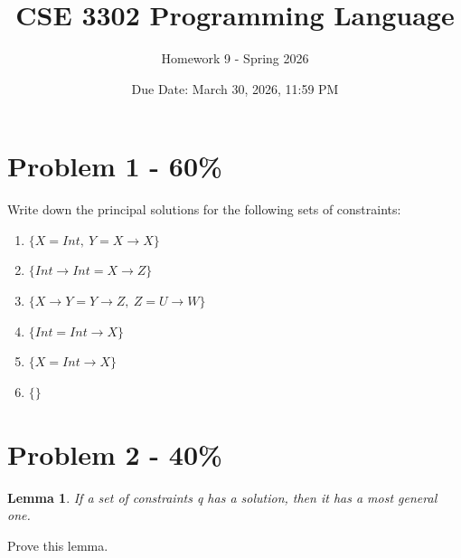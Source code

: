 \documentclass{article}
\newtheorem{lemma}[thm]{Lemma}
\begin{document}
\title{CSE 3302 Programming Language}
\author{Homework 9 - Spring 2026}
\date{Due Date: March 30, 2026, 11:59 PM}
\maketitle
\thispagestyle{fancy}


\section*{Problem 1 - 60\%}

Write down the principal solutions for the following sets of constraints:

\begin{enumerate}
  \item $\{X = Int,\ Y = X\rightarrow X\}$
  \item $\{Int\rightarrow Int = X\rightarrow Z\}$
  \item $\{X\rightarrow Y = Y\rightarrow Z,\ Z = U\rightarrow W\}$
  \item $\{Int = Int\rightarrow X\}$
  \item $\{X = Int\rightarrow X\}$
  \item $\{\}$
\end{enumerate}



\section*{Problem 2 - 40\%}

\begin{lemma}
    If a set of constraints q has a solution, then it has a most general one.
\end{lemma}

Prove this lemma.

\vspace{20pt}
\vspace{0.8em}
\end{document}
